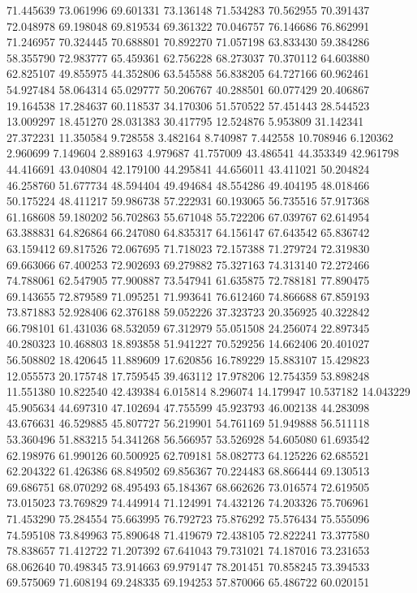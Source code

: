 71.445639
73.061996
69.601331
73.136148
71.534283
70.562955
70.391437
72.048978
69.198048
69.819534
69.361322
70.046757
76.146686
76.862991
71.246957
70.324445
70.688801
70.892270
71.057198
63.833430
59.384286
58.355790
72.983777
65.459361
62.756228
68.273037
70.370112
64.603880
62.825107
49.855975
44.352806
63.545588
56.838205
64.727166
60.962461
54.927484
58.064314
65.029777
50.206767
40.288501
60.077429
20.406867
19.164538
17.284637
60.118537
34.170306
51.570522
57.451443
28.544523
13.009297
18.451270
28.031383
30.417795
12.524876
5.953809
31.142341
27.372231
11.350584
9.728558
3.482164
8.740987
7.442558
10.708946
6.120362
2.960699
7.149604
2.889163
4.979687
41.757009
43.486541
44.353349
42.961798
44.416691
43.040804
42.179100
44.295841
44.656011
43.411021
50.204824
46.258760
51.677734
48.594404
49.494684
48.554286
49.404195
48.018466
50.175224
48.411217
59.986738
57.222931
60.193065
56.735516
57.917368
61.168608
59.180202
56.702863
55.671048
55.722206
67.039767
62.614954
63.388831
64.826864
66.247080
64.835317
64.156147
67.643542
65.836742
63.159412
69.817526
72.067695
71.718023
72.157388
71.279724
72.319830
69.663066
67.400253
72.902693
69.279882
75.327163
74.313140
72.272466
74.788061
62.547905
77.900887
73.547941
61.635875
72.788181
77.890475
69.143655
72.879589
71.095251
71.993641
76.612460
74.866688
67.859193
73.871883
52.928406
62.376188
59.052226
37.323723
20.356925
40.322842
66.798101
61.431036
68.532059
67.312979
55.051508
24.256074
22.897345
40.280323
10.468803
18.893858
51.941227
70.529256
14.662406
20.401027
56.508802
18.420645
11.889609
17.620856
16.789229
15.883107
15.429823
12.055573
20.175748
17.759545
39.463112
17.978206
12.754359
53.898248
11.551380
10.822540
42.439384
6.015814
8.296074
14.179947
10.537182
14.043229
45.905634
44.697310
47.102694
47.755599
45.923793
46.002138
44.283098
43.676631
46.529885
45.807727
56.219901
54.761169
51.949888
56.511118
53.360496
51.883215
54.341268
56.566957
53.526928
54.605080
61.693542
62.198976
61.990126
60.500925
62.709181
58.082773
64.125226
62.685521
62.204322
61.426386
68.849502
69.856367
70.224483
68.866444
69.130513
69.686751
68.070292
68.495493
65.184367
68.662626
73.016574
72.619505
73.015023
73.769829
74.449914
71.124991
74.432126
74.203326
75.706961
71.453290
75.284554
75.663995
76.792723
75.876292
75.576434
75.555096
74.595108
73.849963
75.890648
71.419679
72.438105
72.822241
73.377580
78.838657
71.412722
71.207392
67.641043
79.731021
74.187016
73.231653
68.062640
70.498345
73.914663
69.979147
78.201451
70.858245
73.394533
69.575069
71.608194
69.248335
69.194253
57.870066
65.486722
60.020151
